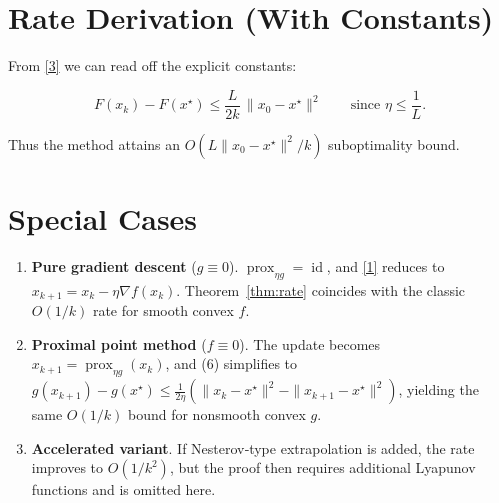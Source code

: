 \documentclass{article}
\newcommand{\prox}{\operatorname{prox}}
\newcommand{\grad}{\nabla}
\begin{document}
\section*{Rate Derivation (With Constants)}
From \eqref{3} we can read off the explicit constants:

\[
\boxed{
F(x_{k})-F(x^{\star})
\le
\frac{L}{2k}\,\|x_{0}-x^{\star}\|^{2}
\qquad\text{since }\eta\le\frac{1}{L}.
}
\tag{14}
\]

Thus the method attains an $O(L\|x_{0}-x^{\star}\|^{2}/k)$ suboptimality bound.

\section*{Special Cases}
\begin{enumerate}[label=\alph*.]
  \item \textbf{Pure gradient descent} ($g\equiv0$).  
        $\prox_{\eta g}=\operatorname{id}$, and \eqref{1} reduces to
        $x_{k+1}=x_{k}-\eta\grad f(x_{k})$.  
        Theorem~\ref{thm:rate} coincides with the classic $O(1/k)$ rate for smooth convex $f$.

  \item \textbf{Proximal point method} ($f\equiv0$).  
        The update becomes $x_{k+1}= \prox_{\eta g}(x_{k})$, and (6) simplifies to
        $g(x_{k+1})-g(x^{\star})\le\frac{1}{2\eta}
        (\|x_{k}-x^{\star}\|^{2}-\|x_{k+1}-x^{\star}\|^{2})$,
        yielding the same $O(1/k)$ bound for nonsmooth convex $g$.

  \item \textbf{Accelerated variant}.  
        If Nesterov‑type extrapolation is added, the rate improves to $O(1/k^{2})$,
        but the proof then requires additional Lyapunov functions and is omitted here.
\end{enumerate}
\end{document}
